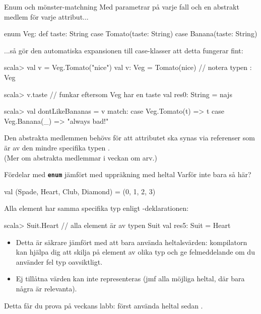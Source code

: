 \begin{Slide}{Enum och mönster-matchning}
\SlideFontSmall
Med parametrar på varje fall och en abstrakt medlem för varje attribut... 
\begin{Code}
enum Veg:
  def taste: String
  case Tomato(taste: String)
  case Banana(taste: String)
\end{Code}
...så gör den automatiska expansionen till case-klasser att detta fungerar fint: 
\begin{REPLsmall}
scala> val v = Veg.Tomato("nice") 
val v: Veg = Tomato(nice)             // notera typen : Veg

scala> v.taste  // funkar eftersom Veg har en taste
val res0: String = najs

scala> val dontLikeBananas = v match:
           case Veg.Tomato(t) => t 
           case Veg.Banana(_) => "always bad!" 
\end{REPLsmall}
Den abstrakta medlemmen  behövs för att attributet ska synas via referenser som är av den mindre specifika typen .\\(Mer om abstrakta medlemmar i veckan om arv.)

\end{Slide}


\begin{Slide}{Fördelar med \texttt{\textbf{enum}} jämfört med uppräkning med heltal}
Varför inte bara så här?
\begin{Code}
val (Spade, Heart, Club, Diamond) = (0, 1, 2, 3)  
\end{Code}  
Alla element har samma specifika typ enligt -deklarationen:  
\begin{REPL}
scala> Suit.Heart              // alla element är av typen Suit 
val res5: Suit = Heart
\end{REPL}

\begin{itemize}
\item Detta är säkrare jämfört med att bara använda heltalsvärden: kompilatorn kan hjälpa dig att skilja på element av olika typ och ge felmeddelande om du använder fel typ oavsiktligt. 
\item Ej tillåtna värden kan inte representeras (jmf alla möjliga heltal, där bara några är relevanta).
\end{itemize}  
Detta får du prova på veckans labb: först använda heltal sedan .
\end{Slide}
